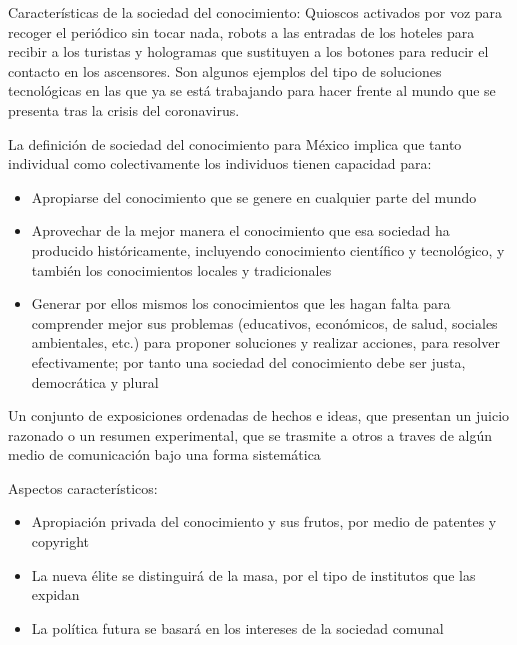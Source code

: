 
Características de la sociedad del conocimiento: Quioscos activados por voz para recoger el periódico sin tocar nada, robots a las entradas de los hoteles para recibir a los turistas y hologramas que sustituyen a los botones para reducir el contacto en los ascensores. Son algunos ejemplos del tipo de soluciones tecnológicas en las que ya se está trabajando para hacer frente al mundo que se presenta tras la crisis del coronavirus.

La definición de sociedad del conocimiento para México implica que tanto individual como colectivamente los individuos tienen capacidad para:
\begin{itemize}
    \item Apropiarse del conocimiento que se genere en cualquier parte del mundo
    \item Aprovechar de la mejor manera el conocimiento que esa sociedad ha producido históricamente, incluyendo conocimiento científico y tecnológico, y también los conocimientos locales y tradicionales
    \item Generar por ellos mismos los conocimientos que les hagan falta para comprender mejor sus problemas (educativos, económicos, de salud, sociales ambientales, etc.) para proponer soluciones y realizar acciones, para resolver efectivamente; por tanto una sociedad del conocimiento debe ser justa, democrática y plural
\end{itemize}
\begin{definition}[Conocimiento]
    Un conjunto de exposiciones ordenadas de hechos e ideas, que presentan un juicio razonado o un resumen experimental, que se trasmite a otros a traves de algún medio de comunicación bajo una forma sistemática
\end{definition}
Aspectos característicos:
\begin{itemize}
    \item Apropiación privada del conocimiento y sus frutos, por medio de patentes y copyright
    \item La nueva élite se distinguirá de la masa, por el tipo de institutos que las expidan
    \item La política futura se basará en los intereses de la sociedad comunal
\end{itemize}

